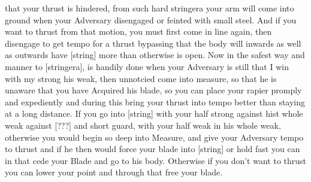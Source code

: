 \newpage


\newpage



that your thrust is hindered, from such hard stringera your arm will
come into ground when your Adversary disengaged or feinted with
small steel. And if you want to thrust from that motion, you must
first come in line again, then disengage to get tempo for a thrust
bypassing that the body will inwards as well as outwards have [string]
more than otherwise is open. Now in the safest way and manner to
[stringera], is handily done when your Adversary is still that I win
with my strong his weak, then unnotcied come into measure, so that he
is unaware that you have Acquired his blade, so you can place your
rapier promply and expediently and during this bring your thrust into
tempo better than staying at a long distance. If you go into [string]
with your half strong against hist whole weak against [???] and short
guard, with your half weak in his whole weak, otherwise you would
begin so deep into Measure, and give your Adversary tempo to thrust
and if he then would force your blade into [string] or hold fast you
can in that cede your Blade and go to his body. Otherwise if you don't
want to thrust you can lower your point and through that free your blade.